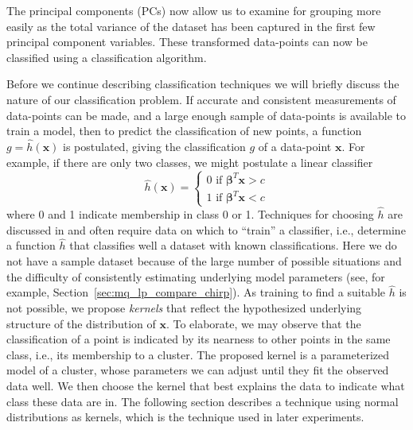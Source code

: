 The principal components (PCs) now allow us to examine for grouping more easily as the
total variance of the dataset has been captured in the first few principal component
variables. These transformed data-points can now be classified using a
classification algorithm.

Before we continue describing classification techniques we will briefly discuss
the nature of our classification problem. If accurate and consistent
measurements of data-points can be made, and a large enough sample of
data-points is available to train a model, then to predict the classification of
new points, a function $g=\hat{h} \left( \boldsymbol{x} \right)$ is postulated,
giving the classification $g$ of a data-point $\boldsymbol{x}$. For example, if
there are only two classes, we might postulate a linear
classifier
\[
    \hat{h}(\boldsymbol{x}) = \begin{cases}
        0 \text{ if } \boldsymbol{\beta}^{T}\boldsymbol{x} > c \\
        1 \text{ if } \boldsymbol{\beta}^{T}\boldsymbol{x} < c
    \end{cases}
\]
where 0 and 1 indicate membership in class 0 or 1. Techniques for choosing
$\hat{h}$ are discussed in \cite{friedman2001elements} and often require data on
which to ``train'' a classifier, i.e., determine a function $\hat{h}$ that
classifies well a dataset with known classifications.  Here we do not have a
sample dataset because of the large number of possible situations and the
difficulty of consistently estimating underlying model parameters (see, for
example, Section~\ref{sec:mq_lp_compare_chirp}). As training to find a suitable
$\hat{h}$ is not possible, we propose \textit{kernels} that reflect the
hypothesized underlying structure of the distribution of $\boldsymbol{x}$. To
elaborate, we may observe that the classification of a
point is indicated by its nearness to other points in the same class, i.e., its
membership to a cluster. The proposed kernel is a parameterized model of a
cluster, whose parameters we can adjust until they fit the observed data well.
We then choose the kernel that best explains the data to indicate what class
these data are in. The following section describes a technique using normal
distributions as kernels, which is the technique used in later experiments.
